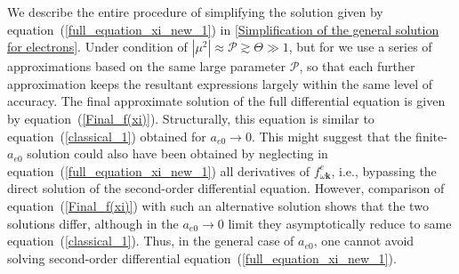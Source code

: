 \documentclass[draft]{agujournal2019}
\renewcommand{\vec}{\mathbf}
\begin{document}
We describe the entire procedure of simplifying the solution given by equation~(\ref{full_equation_xi_new_1}) 
in \ref{Simplification of the general solution for electrons}.
Under condition of $|\mu^{2}| \approx \mathcal{P}\gtrsim \Theta\gg 1$, but for  we use a series of approximations based on the same 
large parameter $\mathcal{P}$, so that each further approximation keeps the resultant expressions largely within the same level of accuracy.
The final approximate solution of the full differential
equation is given by equation~(\ref{Final_f(xi)}). Structurally, this equation is similar to
equation~(\ref{classical_1}) obtained for $a_{e0}\rightarrow 0$. This might suggest that the finite-$a_{e0}$ solution could also
have been obtained by neglecting in equation~(\ref{full_equation_xi_new_1})
all derivatives of $f_{\omega\vec{k}}^{e}$, i.e., bypassing the direct solution of
the second-order differential equation. However, comparison of
equation~(\ref{Final_f(xi)}) with such an alternative solution shows that the two solutions differ,
although in the $a_{e0}\rightarrow 0$ limit they asymptotically reduce to same 
equation~(\ref{classical_1}). Thus, in the general case of  $a_{e0}$, 
one cannot avoid solving second-order differential equation~(\ref{full_equation_xi_new_1}).
\end{document}
